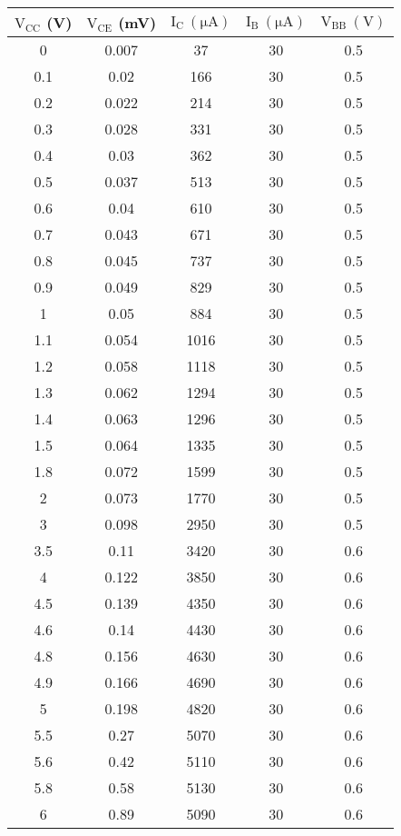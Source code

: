\documentclass[12pt]{article}
\begin{document}
\begin{table}[H]
    \centering
    \begin{tabular}{|c|c|c|c|c|}
    \hline
        $\mathrm{V_{CC}}$ (V) & $\mathrm{V_{CE}}$ (mV) & $\mathrm{I_C \ (\mu A)}$ & $\mathrm{I_B \ (\mu A)}$ & $\mathrm{V_{BB} \ (V)}$ \\ \hline \hline
        0   & 0.007 & 37   & 30 & 0.5 \\ \hline
        0.1 & 0.02  & 166  & 30 & 0.5 \\ \hline
        0.2 & 0.022 & 214  & 30 & 0.5 \\ \hline
        0.3 & 0.028 & 331  & 30 & 0.5 \\ \hline
        0.4 & 0.03  & 362  & 30 & 0.5 \\ \hline
        0.5 & 0.037 & 513  & 30 & 0.5 \\ \hline
        0.6 & 0.04  & 610  & 30 & 0.5 \\ \hline
        0.7 & 0.043 & 671  & 30 & 0.5 \\ \hline
        0.8 & 0.045 & 737  & 30 & 0.5 \\ \hline
        0.9 & 0.049 & 829  & 30 & 0.5 \\ \hline
        1   & 0.05  & 884  & 30 & 0.5 \\ \hline
        1.1 & 0.054 & 1016 & 30 & 0.5 \\ \hline
        1.2 & 0.058 & 1118 & 30 & 0.5 \\ \hline
        1.3 & 0.062 & 1294 & 30 & 0.5 \\ \hline
        1.4 & 0.063 & 1296 & 30 & 0.5 \\ \hline
        1.5 & 0.064 & 1335 & 30 & 0.5 \\ \hline
        1.8 & 0.072 & 1599 & 30 & 0.5 \\ \hline
        2   & 0.073 & 1770 & 30 & 0.5 \\ \hline
        3   & 0.098 & 2950 & 30 & 0.5 \\ \hline
        3.5 & 0.11  & 3420 & 30 & 0.6 \\ \hline
        4   & 0.122 & 3850 & 30 & 0.6 \\ \hline
        4.5 & 0.139 & 4350 & 30 & 0.6 \\ \hline
        4.6 & 0.14  & 4430 & 30 & 0.6 \\ \hline
        4.8 & 0.156 & 4630 & 30 & 0.6 \\ \hline
        4.9 & 0.166 & 4690 & 30 & 0.6 \\ \hline
        5   & 0.198 & 4820 & 30 & 0.6 \\ \hline
        5.5 & 0.27  & 5070 & 30 & 0.6 \\ \hline
        5.6 & 0.42  & 5110 & 30 & 0.6 \\ \hline
        5.8 & 0.58  & 5130 & 30 & 0.6 \\ \hline
        6   & 0.89  & 5090 & 30 & 0.6 \\ \hline
    \end{tabular}
\end{table}
\end{document}
